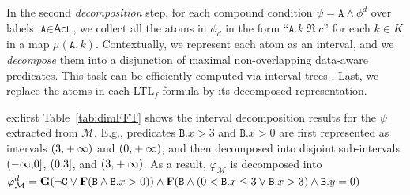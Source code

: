 In the second \textit{decomposition} step, for each compound condition $\psi=\texttt{A}\wedge \phi^d$ over labels $\texttt{A}\in\textsf{Act}$, we collect all the atoms in $\phi_d$ in the form ``$\texttt{A}.k\;\Re\; c$'' for each $k\in K$ in a map $\mu(\texttt{A},k)$. Contextually, we represent each atom as an interval, and we \textit{decompose} them
%
%
%
%
%
%
%
into a disjunction of maximal non-overlapping data-aware predicates. This task can be efficiently computed via interval trees \cite{inttree}. Last, we replace the atoms in each LTL$_f$ formula by its decomposed representation.%
\begin{continueexample}{ex:first}\label{ex:second}
Table~\ref{tab:dimFFT} shows the interval decomposition results for the $\psi$ extracted from $\mathcal{M}$. E.g., predicates $\texttt{B}.x>3$ and $\texttt{B}.x>0$ are first represented as intervals $\interval({3,+\infty})$ and $\interval({0,+\infty})$, and then decomposed into disjoint sub-intervals $\interval({-\infty,0}]$, $\interval({0,3}]$, and $\interval({3,+\infty})$. As a result, $\varphi_{\mathcal{M}}$ is decomposed into $\varphi_{\mathcal{M}}^d=\mathbf{G}(\neg\texttt{C}\vee \mathbf{F}(\texttt{B}\wedge \texttt{B}.x>0))\wedge \mathbf{F}(\texttt{B}\wedge (0<\texttt{B}.x\leq 3\vee \texttt{B}.x> 3) \wedge \texttt{B}.y=0)$
\end{continueexample}


